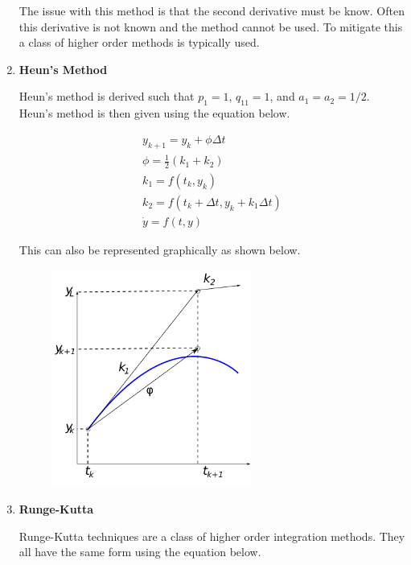 \begin{enumerate}
  The issue with this method is that the second derivative must be
  know. Often this derivative is not known and the method cannot be
  used. To mitigate this a class of higher order methods is typically used.

\item {\bf Heun's Method}

Heun's method is derived such that $p_1=1$, $q_{11} = 1$, and $a_1 =
a_2 = 1/2$. Heun's method is then given using the equation below.

\begin{equation}
\begin{matrix}
y_{k+1} = y_k + \phi \Delta t \\
\phi = \frac{1} 2(k_1 + k_2) \\
k_1 = f(t_k,y_k) \\
k_2 = f(t_k + \Delta t,y_k + k_1 \Delta t) \\
\dot{y} = f(t,y)
\end{matrix}
\end{equation}

This can also be represented graphically as shown below.

\begin{figure}[H]
  \begin{center}
    \includegraphics[height=0.6\textwidth,width=0.62\textwidth]{Graphics/Heuns_Method.pdf}
  \end{center}
\end{figure}

\item {\bf Runge-Kutta}

Runge-Kutta techniques are a class of higher order integration
methods. They all have the same form using the equation below.


\end{enumerate}
